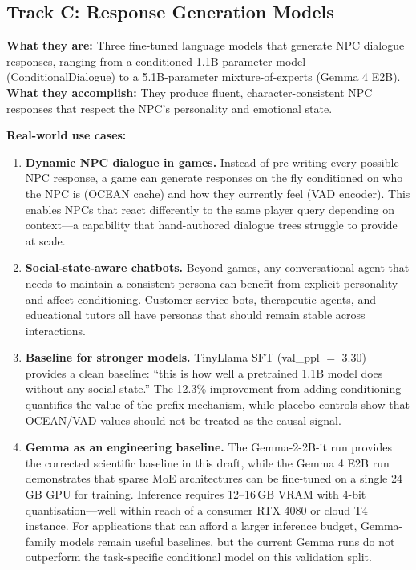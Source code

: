 \documentclass[11pt]{article}
\begin{document}
\subsection{Track C: Response Generation Models}

\textbf{What they are:} Three fine-tuned language models that generate NPC dialogue responses, ranging from a conditioned 1.1B-parameter model (ConditionalDialogue) to a 5.1B-parameter mixture-of-experts (Gemma 4 E2B).
\textbf{What they accomplish:} They produce fluent, character-consistent NPC responses that respect the NPC's personality and emotional state.

\textbf{Real-world use cases:}
\begin{enumerate}
    \item \textbf{Dynamic NPC dialogue in games.} Instead of pre-writing every possible NPC response, a game can generate responses on the fly conditioned on who the NPC is (OCEAN cache) and how they currently feel (VAD encoder).
    This enables NPCs that react differently to the same player query depending on context---a capability that hand-authored dialogue trees struggle to provide at scale.
    \item \textbf{Social-state-aware chatbots.} Beyond games, any conversational agent that needs to maintain a consistent persona can benefit from explicit personality and affect conditioning.
    Customer service bots, therapeutic agents, and educational tutors all have personas that should remain stable across interactions.
    \item \textbf{Baseline for stronger models.} TinyLlama SFT (val\_ppl $=$ 3.30) provides a clean baseline: ``this is how well a pretrained 1.1B model does without any social state.''
    The 12.3\% improvement from adding conditioning quantifies the value of the prefix mechanism, while placebo controls show that OCEAN/VAD values should not be treated as the causal signal.
    \item \textbf{Gemma as an engineering baseline.} The Gemma-2-2B-it run provides the corrected scientific baseline in this draft, while the Gemma 4 E2B run demonstrates that sparse MoE architectures can be fine-tuned on a single 24\,GB GPU for training.
    Inference requires 12--16\,GB VRAM with 4-bit quantisation---well within reach of a consumer RTX 4080 or cloud T4 instance.
    For applications that can afford a larger inference budget, Gemma-family models remain useful baselines, but the current Gemma runs do not outperform the task-specific conditional model on this validation split.
\end{enumerate}
\end{document}
